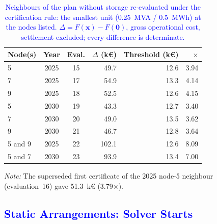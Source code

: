 \begin{table}[htbp!]
    \centering
    \caption{\textcolor{blue}{Neighbours of the plan without storage re-evaluated under the certification rule: the smallest unit (0.25~MVA / 0.5~MWh) at the nodes listed. $\Delta = F(\boldsymbol{x}) - F(\boldsymbol{0})$, gross operational cost, settlement excluded; every difference is determinate.}}
    \label{tab:appE_neighbours}
    \scriptsize\setlength{\tabcolsep}{5pt}
    \begin{tabular}{l c c r r r}
        \toprule
        Node(s) & Year & Eval. & $\Delta$ (k\euro) & Threshold (k\euro) & $\times$ \\
        \midrule
        5 & 2025 & 15 & 49.7 & 12.6 & 3.94 \\
        7 & 2025 & 17 & 54.9 & 13.3 & 4.14 \\
        9 & 2025 & 18 & 52.5 & 12.6 & 4.15 \\
        5 & 2030 & 19 & 43.3 & 12.7 & 3.40 \\
        7 & 2030 & 20 & 49.0 & 13.5 & 3.62 \\
        9 & 2030 & 21 & 46.7 & 12.8 & 3.64 \\
        5 and 9 & 2025 & 22 & 102.1 & 12.6 & 8.09 \\
        5 and 7 & 2030 & 23 & 93.9 & 13.4 & 7.00 \\
        \bottomrule
    \end{tabular}
    \par\smallskip
    \begin{minipage}{0.80\linewidth}
        \scriptsize\raggedright
        \textit{Note:} The superseded first certificate of the 2025 node-5 neighbour (evaluation~16) gave 51.3~k\euro{} (3.79$\times$).
    \end{minipage}
\end{table}

\subsection{\textcolor{blue}{Static Arrangements: Solver Starts}}
\label{app:results_benchmark}

